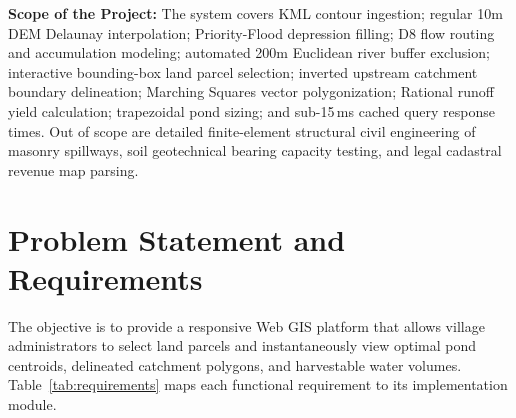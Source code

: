 \documentclass[manuscript,screen,review]{acmart}
\begin{document}
\textbf{Scope of the Project:} The system covers KML contour ingestion; regular 10m DEM Delaunay interpolation; Priority-Flood depression filling; D8 flow routing and accumulation modeling; automated 200m Euclidean river buffer exclusion; interactive bounding-box land parcel selection; inverted upstream catchment boundary delineation; Marching Squares vector polygonization; Rational runoff yield calculation; trapezoidal pond sizing; and sub-15\,ms cached query response times. Out of scope are detailed finite-element structural civil engineering of masonry spillways, soil geotechnical bearing capacity testing, and legal cadastral revenue map parsing.

\section{Problem Statement and Requirements}
\label{sec:requirements}
The objective is to provide a responsive Web GIS platform that allows village administrators to select land parcels and instantaneously view optimal pond centroids, delineated catchment polygons, and harvestable water volumes. Table~\ref{tab:requirements} maps each functional requirement to its implementation module.
\end{document}
